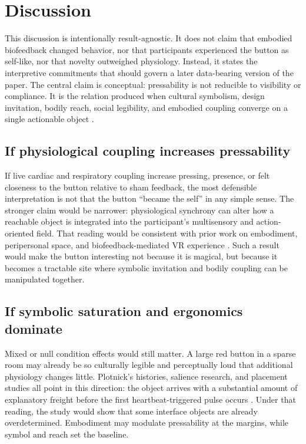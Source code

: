 \section{Discussion}

This discussion is intentionally result-agnostic. It does not claim that embodied biofeedback changed behavior, nor that participants experienced the button as self-like, nor that novelty outweighed physiology. Instead, it states the interpretive commitments that should govern a later data-bearing version of the paper. The central claim is conceptual: pressability is not reducible to visibility or compliance. It is the relation produced when cultural symbolism, design invitation, bodily reach, social legibility, and embodied coupling converge on a single actionable object \citep{Plotnick2018,Gaver1991,McCarthyWright2004}.

\subsection{If physiological coupling increases pressability}

If live cardiac and respiratory coupling increase pressing, presence, or felt closeness to the button relative to sham feedback, the most defensible interpretation is not that the button ``became the self'' in any simple sense. The stronger claim would be narrower: physiological synchrony can alter how a reachable object is integrated into the participant's multisensory and action-oriented field. That reading would be consistent with prior work on embodiment, peripersonal space, and biofeedback-mediated VR experience \citep{KilteniEtAl2012,Serino2019,RockstrohEtAl2019,ChittaroEtAl2024}. Such a result would make the button interesting not because it is magical, but because it becomes a tractable site where symbolic invitation and bodily coupling can be manipulated together.

\subsection{If symbolic saturation and ergonomics dominate}

Mixed or null condition effects would still matter. A large red button in a sparse room may already be so culturally legible and perceptually loud that additional physiology changes little. Plotnick's histories, salience research, and placement studies all point in this direction: the object arrives with a substantial amount of explanatory freight before the first heartbeat-triggered pulse occurs \citep{PlotnickInterface2012,PlotnickWarfare2012,ElliotMaier2014,Li2008,Lin2021}. Under that reading, the study would show that some interface objects are already overdetermined. Embodiment may modulate pressability at the margins, while symbol and reach set the baseline.

